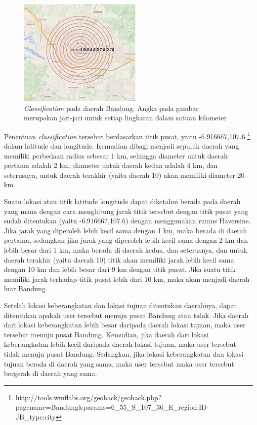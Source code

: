 \begin{figure}
\centering
\includegraphics[scale=1.5]{Gambar/classificationmap.jpg}
\caption[\textsl{Classification} pada daerah Bandung]{\textsl{Classification} pada daerah Bandung. Angka pada gambar merupakan jari-jari untuk setiap lingkaran dalam satuan kilometer}
\label{fig:classificationMap} 
\end{figure}

Penentuan \textsl{classification} tersebut berdasarkan titik pusat, yaitu -6.916667,107.6 \footnote{http://tools.wmflabs.org/geohack/geohack.php?pagename=Bandung\&params=6\_55\_S\_107\_36\_E\_region:ID-JB\_type:city} dalam latitude dan longitude. Kemudian dibagi menjadi sepuluh daerah yang memiliki perbedaan radius sebesar 1 km, sehingga diameter untuk daerah pertama adalah 2 km, diameter untuk daerah kedua adalah 4 km, dan seterusnya, untuk daerah terakhir (yaitu daerah 10) akan memiliki diameter 20 km.

Suatu lokasi atau titik latitude longitude dapat diketahui berada pada daerah yang mana dengan cara menghitung jarak titik tersebut dengan titik pusat yang sudah ditentukan (yaitu -6.916667,107.6) dengan menggunakan rumus Haversine. Jika jarak yang diperoleh lebih kecil sama dengan 1 km, maka berada di daerah pertama, sedangkan jika jarak yang diperoleh lebih kecil sama dengan 2 km dan lebih besar dari 1 km, maka berada di daerah kedua, dan seterusnya, dan untuk daerah terakhir (yaitu daerah 10) titik akan memiliki jarak lebih kecil sama dengan 10 km dan lebih besar dari 9 km dengan titik pusat. Jika suatu titik memiliki jarak terhadap titik pusat lebih dari 10 km, maka akan menjadi daerah luar Bandung.

Setelah lokasi keberangkatan dan lokasi tujuan ditentukan daerahnya, dapat ditentukan apakah user tersebut menuju pusat Bandung atau tidak. Jika daerah dari lokasi keberangkatan lebih besar daripada daerah lokasi tujuan, maka user tersebut menuju pusat Bandung. Kemudian, jika daerah dari lokasi keberangkatan lebih kecil daripada daerah lokasi tujuan, maka user tersebut tidak menuju pusat Bandung. Sedangkan, jika lokasi keberangkatan dan lokasi tujuan berada di daerah yang sama, maka user tersebut maka user tersebut bergerak di daerah yang sama.

